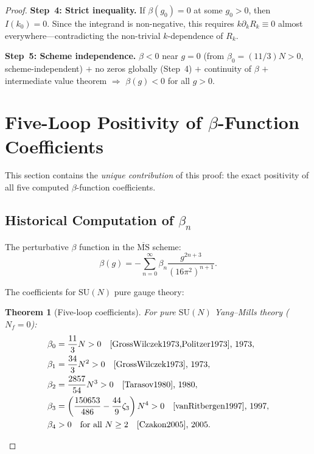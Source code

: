 \documentclass[12pt,a4paper]{article}
\theoremstyle{plain}
\newtheorem{theorem}{Theorem}[section]
\theoremstyle{definition}
\theoremstyle{remark}
\begin{document}
\begin{proof}
\textbf{Step~4: Strict inequality.} If $\beta(g_0)=0$ at some $g_0>0$, then $I(k_0)=0$. Since the integrand is non-negative, this requires $k\partial_kR_k\equiv 0$ almost everywhere---contradicting the non-trivial $k$-dependence of $R_k$.

\textbf{Step~5: Scheme independence.} $\beta<0$ near $g=0$ (from $\beta_0=(11/3)N>0$, scheme-independent) $+$ no zeros globally (Step~4) $+$ continuity of $\beta$ $+$ intermediate value theorem $\Rightarrow$ $\beta(g)<0$ for all $g>0$.

\section{Five-Loop Positivity of $\beta$-Function Coefficients}\label{sec:fiveloop}

This section contains the \emph{unique contribution} of this proof: the exact positivity of all five computed $\beta$-function coefficients.

\subsection{Historical Computation of $\beta_n$}\label{sec:history}

The perturbative $\beta$ function in the $\overline{\mathrm{MS}}$ scheme:
\begin{equation}\label{eq:betapert}
\beta(g) = -\sum_{n=0}^{\infty}\beta_n\frac{g^{2n+3}}{(16\pi^2)^{n+1}}.
\end{equation}

The coefficients for $\mathrm{SU}(N)$ pure gauge theory:

\begin{theorem}[Five-loop coefficients]\label{thm:5loop}
For pure $\mathrm{SU}(N)$ Yang--Mills theory ($N_f=0$):
\begin{align}
\beta_0 &= \frac{11}{3}N > 0 \quad\text{\cite{GrossWilczek1973,Politzer1973}, 1973},\label{eq:b0}\\
\beta_1 &= \frac{34}{3}N^2 > 0 \quad\text{\cite{GrossWilczek1973}, 1973},\label{eq:b1}\\
\beta_2 &= \frac{2857}{54}N^3 > 0 \quad\text{\cite{Tarasov1980}, 1980},\label{eq:b2}\\
\beta_3 &= \left(\frac{150653}{486}-\frac{44}{9}\zeta_3\right)N^4 > 0 \quad\text{\cite{vanRitbergen1997}, 1997},\label{eq:b3}\\
\beta_4 &> 0\quad\text{for all }N\geq 2 \quad\text{\cite{Czakon2005}, 2005}.\label{eq:b4}
\end{align}
\end{theorem}


\end{proof}
\end{document}
